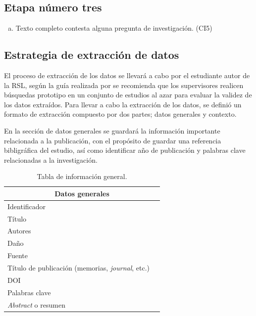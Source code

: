\documentclass[conference,onecolumn,10pt]{IEEEtran}
\begin{document}
\subsection{Etapa número tres}
\begin{enumerate}[(a)]
  \item{Texto completo contesta alguna pregunta de investigación. (CI5)}
\end{enumerate}
\newpage

\subsection{Estrategia de extracción de datos}
El proceso de extracción de los datos se llevará a cabo por el estudiante autor de la RSL, según la guía realizada por
\cite{kitchenham2007guidelines} se recomienda que los supervisores realicen búsquedas prototipo en un conjunto de estudios al azar para evaluar la validez 
de los datos extraídos.
Para llevar a cabo la extracción de los datos, se definió un formato de extracción compuesto por dos partes; datos generales y contexto.

En la sección de datos generales se guardará la información importante relacionada a la publicación, con el propósito de guardar 
una referencia bibligráfica del estudio, así como identificar año de publicación y palabras clave relacionadas a la investigación. 

\begin{table}
\begin{center}
\caption{Tabla de información general.}
\begin{tabular}{ |l|l| }
\hline
\multicolumn{2}{|c|}{Datos generales} \\
  \hline
    Identificador &       \\
    \hline
    Título & \\
    \hline
    Autores &\\
    \hline
    Daño & \\
    \hline
    Fuente & \\
    \hline
    Título de publicación (memorias, \emph{journal}, etc.) & \\
    \hline
    DOI & \\
    \hline
    Palabras clave & \\
    \hline
    \emph{Abstract} o resumen & \\
 \hline
\end{tabular}
\end{center}
\end{table}
\end{document}
